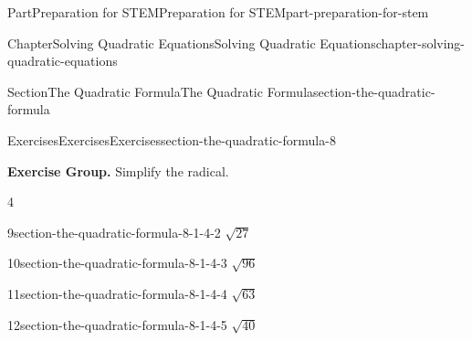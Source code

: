 \documentclass[twoside,10pt,]{book}
\numberwithin{equation}{section}
\begin{document}
\begin{partptx}{Part}{Preparation for STEM}{}{Preparation for STEM}{}{}{part-preparation-for-stem}
\begin{chapterptx}{Chapter}{Solving Quadratic Equations}{}{Solving Quadratic Equations}{}{}{chapter-solving-quadratic-equations}
\begin{sectionptx}{Section}{The Quadratic Formula}{}{The Quadratic Formula}{}{}{section-the-quadratic-formula}
\begin{exercises-subsection}{Exercises}{Exercises}{}{Exercises}{}{}{section-the-quadratic-formula-8}
\par\medskip\noindent
\par\medskip\noindent%
\textbf{Exercise Group.}\space\space%
Simplify the radical.%
\begin{exercisegroupcol}{4}
\begin{divisionexerciseegcol}{9}{}{}{section-the-quadratic-formula-8-1-4-2}%
\(\sqrt{27}\)%
\end{divisionexerciseegcol}%
\begin{divisionexerciseegcol}{10}{}{}{section-the-quadratic-formula-8-1-4-3}%
\(\sqrt{96}\)%
\end{divisionexerciseegcol}%
\begin{divisionexerciseegcol}{11}{}{}{section-the-quadratic-formula-8-1-4-4}%
\(\sqrt{63}\)%
\end{divisionexerciseegcol}%
\begin{divisionexerciseegcol}{12}{}{}{section-the-quadratic-formula-8-1-4-5}%
\(\sqrt{40}\)%
\end{divisionexerciseegcol}%
\end{exercisegroupcol}
\par\medskip\noindent

\end{exercises-subsection}
\end{sectionptx}
\end{chapterptx}
\end{partptx}
\end{document}
